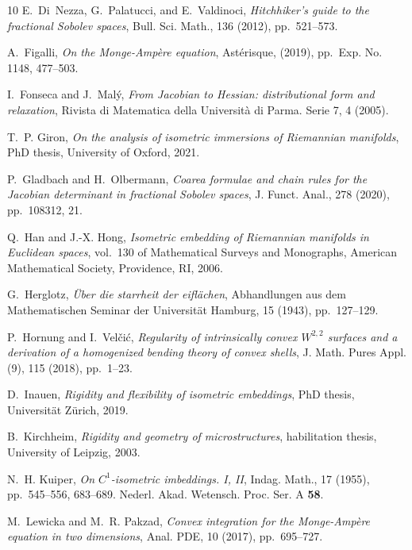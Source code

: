 \documentclass[12pt]{article}
\theoremstyle{plain}
\numberwithin{equation}{section}
\begin{document}
\begin{thebibliography}{10}
{\sc E.~Di~Nezza, G.~Palatucci, and E.~Valdinoci}, {\em Hitchhiker's guide to
  the fractional {S}obolev spaces}, Bull. Sci. Math., 136 (2012), pp.~521--573.

{\sc A.~Figalli}, {\em On the {M}onge-{A}mp\`ere equation}, Ast\'{e}risque,
  (2019), pp.~Exp. No. 1148, 477--503.

{\sc I.~Fonseca and J.~Malý}, {\em From {J}acobian to {H}essian:
  distributional form and relaxation}, Rivista di Matematica della Università
  di Parma. Serie 7, 4 (2005).

{\sc T.~P. Giron}, {\em On the analysis of isometric immersions of {R}iemannian
  manifolds}, PhD thesis, University of Oxford, 2021.

{\sc P.~Gladbach and H.~Olbermann}, {\em Coarea formulae and chain rules for
  the {J}acobian determinant in fractional {S}obolev spaces}, J. Funct. Anal.,
  278 (2020), pp.~108312, 21.

{\sc Q.~Han and J.-X. Hong}, {\em Isometric embedding of {R}iemannian manifolds
  in {E}uclidean spaces}, vol.~130 of Mathematical Surveys and Monographs,
  American Mathematical Society, Providence, RI, 2006.

{\sc G.~Herglotz}, {\em {\"U}ber die starrheit der eifl{\"a}chen}, Abhandlungen
  aus dem Mathematischen Seminar der Universit{\"a}t Hamburg, 15 (1943),
  pp.~127--129.

{\sc P.~Hornung and I.~Vel\v{c}i\'{c}}, {\em Regularity of intrinsically convex
  {$W^{2,2}$} surfaces and a derivation of a homogenized bending theory of
  convex shells}, J. Math. Pures Appl. (9), 115 (2018), pp.~1--23.

{\sc D.~Inauen}, {\em Rigidity and flexibility of isometric embeddings}, PhD
  thesis, Universität Zürich, 2019.

{\sc B.~Kirchheim}, {\em Rigidity and geometry of microstructures},
  habilitation thesis, University of Leipzig, 2003.

{\sc N.~H. Kuiper}, {\em On {$C^1$}-isometric imbeddings. {I}, {II}}, Indag.
  Math., 17 (1955), pp.~545--556, 683--689.
\newblock Nederl. Akad. Wetensch. Proc. Ser. A {\bf 58}.

{\sc M.~Lewicka and M.~R. Pakzad}, {\em Convex integration for the
  {M}onge-{A}mp\`ere equation in two dimensions}, Anal. PDE, 10 (2017),
  pp.~695--727.


\end{thebibliography}
\end{document}
